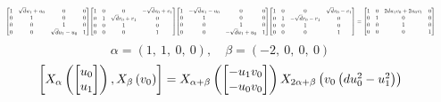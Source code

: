 \documentclass[11pt]{article}
\theoremstyle{definition}
\begin{document}
\[
\scaletoalign{\textwidth}{{\left[\begin{matrix}1 & \sqrt{d} u_{1} + u_{0} & 0 & 0\\0 & 1 & 0 & 0\\0 & 0 & 1 & 0\\0 & 0 & \sqrt{d} u_{1} - u_{0} & 1\end{matrix}\right]} {\left[\begin{matrix}1 & 0 & 0 & - \sqrt{d} v_{0} + v_{1}\\0 & 1 & \sqrt{d} v_{0} + v_{1} & 0\\0 & 0 & 1 & 0\\0 & 0 & 0 & 1\end{matrix}\right]} {\left[\begin{matrix}1 & - \sqrt{d} u_{1} - u_{0} & 0 & 0\\0 & 1 & 0 & 0\\0 & 0 & 1 & 0\\0 & 0 & - \sqrt{d} u_{1} + u_{0} & 1\end{matrix}\right]} {\left[\begin{matrix}1 & 0 & 0 & \sqrt{d} v_{0} - v_{1}\\0 & 1 & - \sqrt{d} v_{0} - v_{1} & 0\\0 & 0 & 1 & 0\\0 & 0 & 0 & 1\end{matrix}\right]} = {\left[\begin{matrix}1 & 0 & 2 d u_{1} v_{0} + 2 u_{0} v_{1} & 0\\0 & 1 & 0 & 0\\0 & 0 & 1 & 0\\0 & 0 & 0 & 1\end{matrix}\right]}}
\]
\[
\alpha = \left( 1, \  1, \  0, \  0\right), \quad \beta = \left( -2, \  0, \  0, \  0\right)
\]
\[
\scaletoalign{\textwidth}{\left[ X_{\alpha}\left(\left[\begin{matrix}u_{0}\\u_{1}\end{matrix}\right]\right), X_{\beta}\left(v_{0}\right) \right] = X_{\alpha + \beta}\left(\left[\begin{matrix}- u_{1} v_{0}\\- u_{0} v_{0}\end{matrix}\right]\right) X_{2\alpha + \beta}\left(v_{0} \left(d u_{0}^{2} - u_{1}^{2}\right)\right)}
\]
\end{document}
